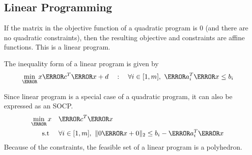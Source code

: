 \subsection{Linear Programming}
If the matrix in the objective function of a quadratic program is 0 (and there are no quadratic constraints), then the resulting objective and constraints are affine functions.
This is a linear program.
\begin{definition}
	The inequality form of a linear program is given by \[
		\min_\V{x} \V{c}^T\V{x} + d \quad : \quad \forall i\in[1,m],\ \V{a}_i^T\V{x} \leq b_i
	\]
	\label{defn:lp}
\end{definition}
Since linear program is a special case of a quadratic program, it can also be expressed as an SOCP.
\begin{align*}
	\min_\V{x} &\quad \V{c}^T\V{x}\\
	\text{s.t } &\quad \forall i\in[1,m],\ \|0\V{x} + 0\|_2 \leq b_i - \V{a}_i^T\V{x}
\end{align*}
Because of the constraints, the feasible set of a linear program is a polyhedron.


